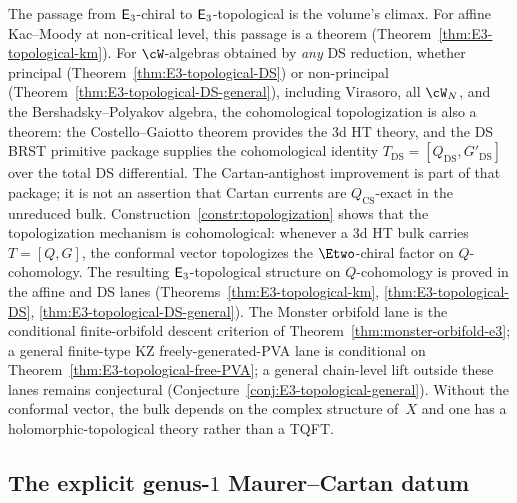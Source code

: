 \begin{remark}
\label{rem:E3-dichotomy-architecture}
The passage from $\mathsf{E}_3$-chiral to $\mathsf{E}_3$-topological is
the volume's climax. For affine Kac--Moody at non-critical
level, this passage is a theorem
\textup{(}Theorem~\ref{thm:E3-topological-km}\textup{)}.
For $\cW$-algebras obtained by \emph{any} DS reduction,
whether principal
\textup{(}Theorem~\ref{thm:E3-topological-DS}\textup{)} or
non-principal
\textup{(}Theorem~\ref{thm:E3-topological-DS-general}\textup{)},
including Virasoro, all $\cW_N$, and the Bershadsky--Polyakov
algebra, the cohomological topologization is also a theorem:
the Costello--Gaiotto theorem provides the $3$d HT theory,
and the DS BRST primitive package supplies the cohomological identity
$T_{\mathrm{DS}} = [Q_{\mathrm{DS}}, G'_{\mathrm{DS}}]$ over the
total DS differential.  The Cartan-antighost improvement is part of
that package; it is not an assertion that Cartan currents are
\(Q_{\mathrm{CS}}\)-exact in the unreduced bulk.
Construction~\ref{constr:topologization} shows that the
topologization mechanism is cohomological: whenever a $3$d HT
bulk carries $T=[Q,G]$, the conformal vector topologizes the
$\Etwo$-chiral factor on $Q$-cohomology. The resulting
$\mathsf{E}_3$-topological structure on $Q$-cohomology is proved in the
affine and DS lanes
\textup{(}Theorems~\ref{thm:E3-topological-km},
\ref{thm:E3-topological-DS},
\ref{thm:E3-topological-DS-general}\textup{)}. The Monster orbifold
lane is the conditional finite-orbifold descent criterion of
Theorem~\ref{thm:monster-orbifold-e3}; a general finite-type KZ
freely-generated-PVA lane is conditional on
Theorem~\ref{thm:E3-topological-free-PVA}; a general chain-level lift
outside these lanes remains conjectural
\textup{(}Conjecture~\ref{conj:E3-topological-general}\textup{)}.
Without the conformal vector, the bulk depends on the complex
structure of~$X$ and one has a holomorphic-topological theory
rather than a TQFT.
\end{remark}


\subsection{The explicit genus-$1$ Maurer--Cartan datum}
\label{subsec:gravity-genus1-mc-datum}

